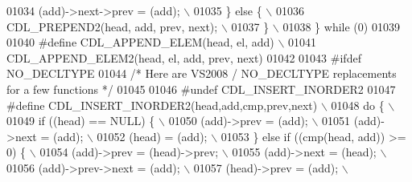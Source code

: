 \begin{DoxyCode}
01034 \textcolor{preprocessor}{  (add)->next->prev = (add);                                                                   \(\backslash\)}
01035 \textcolor{preprocessor}{ \} else \{                                                                                      \(\backslash\)}
01036 \textcolor{preprocessor}{  CDL\_PREPEND2(head, add, prev, next);                                                         \(\backslash\)}
01037 \textcolor{preprocessor}{ \}                                                                                             \(\backslash\)}
01038 \textcolor{preprocessor}{\} while (0)}
01039 
01040 \textcolor{preprocessor}{#define CDL\_APPEND\_ELEM(head, el, add)                                                         \(\backslash\)}
01041 \textcolor{preprocessor}{    CDL\_APPEND\_ELEM2(head, el, add, prev, next)}
01042 
01043 \textcolor{preprocessor}{#ifdef NO\_DECLTYPE}
01044 \textcolor{comment}{/* Here are VS2008 / NO\_DECLTYPE replacements for a few functions */}
01045 
01046 \textcolor{preprocessor}{#undef CDL\_INSERT\_INORDER2}
01047 \textcolor{preprocessor}{#define CDL\_INSERT\_INORDER2(head,add,cmp,prev,next)                                            \(\backslash\)}
01048 \textcolor{preprocessor}{do \{                                                                                           \(\backslash\)}
01049 \textcolor{preprocessor}{  if ((head) == NULL) \{                                                                        \(\backslash\)}
01050 \textcolor{preprocessor}{    (add)->prev = (add);                                                                       \(\backslash\)}
01051 \textcolor{preprocessor}{    (add)->next = (add);                                                                       \(\backslash\)}
01052 \textcolor{preprocessor}{    (head) = (add);                                                                            \(\backslash\)}
01053 \textcolor{preprocessor}{  \} else if ((cmp(head, add)) >= 0) \{                                                          \(\backslash\)}
01054 \textcolor{preprocessor}{    (add)->prev = (head)->prev;                                                                \(\backslash\)}
01055 \textcolor{preprocessor}{    (add)->next = (head);                                                                      \(\backslash\)}
01056 \textcolor{preprocessor}{    (add)->prev->next = (add);                                                                 \(\backslash\)}
01057 \textcolor{preprocessor}{    (head)->prev = (add);                                                                      \(\backslash\)}

\end{DoxyCode}
